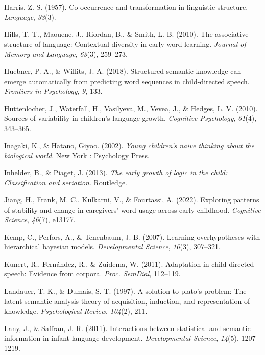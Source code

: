 \documentclass[english,,man]{apa6}
\begin{document}
\leavevmode\hypertarget{ref-harris1957}{}%
Harris, Z. S. (1957). Co-occurrence and transformation in linguistic structure. \emph{Language}, \emph{33}(3).

\leavevmode\hypertarget{ref-hills2010}{}%
Hills, T. T., Maouene, J., Riordan, B., \& Smith, L. B. (2010). The associative structure of language: Contextual diversity in early word learning. \emph{Journal of Memory and Language}, \emph{63}(3), 259--273.

\leavevmode\hypertarget{ref-huebner2018}{}%
Huebner, P. A., \& Willits, J. A. (2018). Structured semantic knowledge can emerge automatically from predicting word sequences in child-directed speech. \emph{Frontiers in Psychology}, \emph{9}, 133.

\leavevmode\hypertarget{ref-huttenlocher2010sources}{}%
Huttenlocher, J., Waterfall, H., Vasilyeva, M., Vevea, J., \& Hedges, L. V. (2010). Sources of variability in children's language growth. \emph{Cognitive Psychology}, \emph{61}(4), 343--365.

\leavevmode\hypertarget{ref-inagaki2002}{}%
Inagaki, K., \& Hatano, Giyoo. (2002). \emph{Young children's naive thinking about the biological world}. New York : Psychology Press.

\leavevmode\hypertarget{ref-inhelder2013}{}%
Inhelder, B., \& Piaget, J. (2013). \emph{The early growth of logic in the child: Classification and seriation}. Routledge.

\leavevmode\hypertarget{ref-jiang2022exploring}{}%
Jiang, H., Frank, M. C., Kulkarni, V., \& Fourtassi, A. (2022). Exploring patterns of stability and change in caregivers' word usage across early childhood. \emph{Cognitive Science}, \emph{46}(7), e13177.

\leavevmode\hypertarget{ref-kemp2007learning}{}%
Kemp, C., Perfors, A., \& Tenenbaum, J. B. (2007). Learning overhypotheses with hierarchical bayesian models. \emph{Developmental Science}, \emph{10}(3), 307--321.

\leavevmode\hypertarget{ref-kunert2011adaptation}{}%
Kunert, R., Fernández, R., \& Zuidema, W. (2011). Adaptation in child directed speech: Evidence from corpora. \emph{Proc. SemDial}, 112--119.

\leavevmode\hypertarget{ref-landauer1997solution}{}%
Landauer, T. K., \& Dumais, S. T. (1997). A solution to plato's problem: The latent semantic analysis theory of acquisition, induction, and representation of knowledge. \emph{Psychological Review}, \emph{104}(2), 211.

\leavevmode\hypertarget{ref-lany2011}{}%
Lany, J., \& Saffran, J. R. (2011). Interactions between statistical and semantic information in infant language development. \emph{Developmental Science}, \emph{14}(5), 1207--1219.
\end{document}
